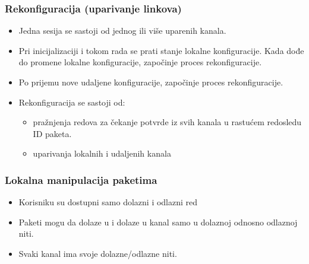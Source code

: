 \documentclass{beamer}
\begin{document}
    \begin{frame}
        \frametitle{Rekonfiguracija (uparivanje linkova)}

        \begin{itemize}
            \item{Jedna sesija se sastoji od jednog ili više uparenih kanala.}
            \item{Pri inicijalizaciji i tokom rada se prati stanje lokalne
                    konfiguracije. Kada dođe do promene lokalne konfiguracije,
                    započinje proces rekonfiguracije.}
            \item{Po prijemu nove udaljene konfiguracije, započinje proces
                    rekonfiguracije.}
            \item{Rekonfiguracija se sastoji od:}
                \begin{itemize}
                    \item{pražnjenja redova za čekanje potvrde iz svih
                        kanala u rastućem redosledu ID paketa.}
                    \item{uparivanja lokalnih i udaljenih kanala}
                \end{itemize}
            \end{itemize}
    \end{frame}

    \begin{frame}
        \frametitle{Lokalna manipulacija paketima}

        \begin{itemize}
            \item{Korisniku su dostupni samo dolazni i odlazni red}
            \item{Paketi mogu da dolaze u i dolaze u kanal samo u dolaznoj
                    odnosno odlaznoj niti.}
            \item{Svaki kanal ima svoje dolazne/odlazne niti.}
        \end{itemize}
    \end{frame}
\end{document}
